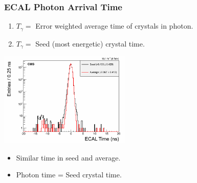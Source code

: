 \documentclass{beamer}
\begin{document}
\begin{frame}
\frametitle{ECAL Photon Arrival Time}
  \begin{minipage}[t]{0.83\paperwidth} 
        \begin{enumerate}
         \item $T_{\gamma} =$ Error weighted average time of crystals in photon.
         \item $T_{\gamma} =$ Seed (most energetic) crystal time.        
        \end{enumerate}
        \begin{tcolorbox}[colback=UNL@Cream!5,colframe=UNL@Cream!70,title=\textcolor{UMN@Maroon}{\textbf{Photon Arrival Time}}] 
       \includegraphics[height=4.5cm,width=0.70\linewidth]                     {THESISPLOTS/AverageVsSeedTime_ECAL.png}   
        \end{tcolorbox}
 \end{minipage}
 \begin{minipage}[b]{\linewidth}
        \begin{itemize}
         \item  Similar time in seed and average.
          \item  Photon time = Seed crystal time.
        \end{itemize}
 \end{minipage}
\end{frame}
	
\end{document}
